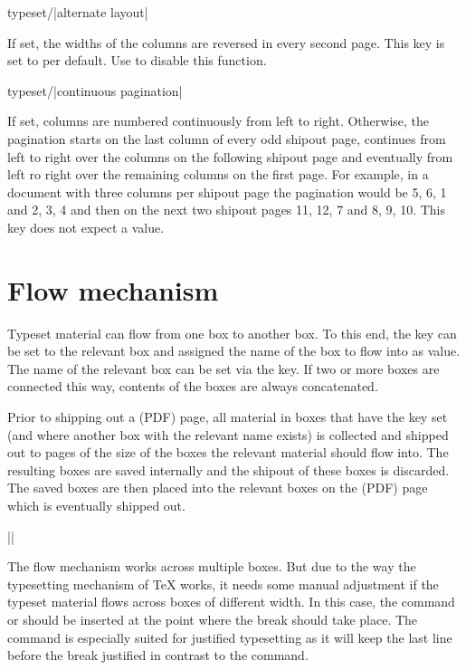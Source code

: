 \documentclass[a4paper]{article}
\begin{document}
\begin{macrodef}
typeset/|alternate layout|
\end{macrodef}
If set, the widths of the columns are reversed in every second page. This key is set to  per default. Use  to disable this function.

\begin{macrodef}
typeset/|continuous pagination|
\end{macrodef}
If set, columns are numbered continuously from left to right. Otherwise, the pagination starts on the last column of every odd shipout page, continues from left to right over the columns on the following shipout page and eventually from left ro right over the remaining columns on the first page. For example, in a document with three columns per shipout page the pagination would be 5, 6, 1 and 2, 3, 4 and then on the next two shipout pages 11, 12, 7 and 8, 9, 10. This key does not expect a value.

\section{Flow mechanism}\label{sec:flow}

Typeset material can flow from one box to another box. To this end, the key  can be set to the relevant box and assigned the name of the box to flow into as value. The name of the relevant box can be set via the  key. If two or more boxes are connected this way, contents of the boxes are always concatenated.

Prior to shipping out a (PDF) page, all material in boxes that have the  key set (and where another box with the relevant name exists) is collected and shipped out to pages of the size of the boxes the relevant material should flow into. The resulting boxes are saved internally and the shipout of these boxes is discarded. The saved boxes are then placed into the relevant boxes on the (PDF) page which is eventually shipped out.

\begin{macrodef}
|\leporelloboxbreak|
\end{macrodef}
The flow mechanism works across multiple boxes. But due to the way the typesetting mechanism of TeX works, it needs some manual adjustment if the typeset material flows across boxes of different width. In this case, the command \macro{\leporelloboxbreak} or \macro{\pagebreak} should be inserted at the point where the break should take place. The command \macro{\leporelloboxbreak} is especially suited for justified typesetting as it will keep the last line before the break justified in contrast to the \macro{\pagebreak} command.
\end{document}
